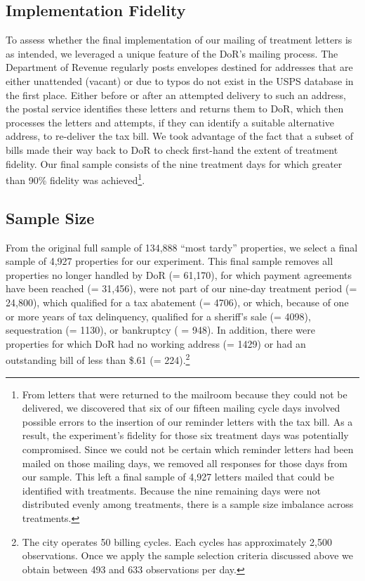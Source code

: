 \documentclass[12pt,titlepage]{article}
\begin{document}
\subsection{Implementation Fidelity}

To assess whether the final implementation of our mailing of treatment
letters is as intended, we leveraged a unique feature of the DoR's
mailing process.  The Department of Revenue regularly posts envelopes
destined for addresses that are either unattended (vacant) or due to typos do not
exist in the USPS database in the first place. Either before or after an
attempted delivery to such an address, the postal service identifies
these letters and returns them to DoR, which then processes the
letters and attempts, if they can identify a suitable alternative
address, to re-deliver the tax bill. We took advantage of the fact
that a subset of bills made their way back to DoR to check first-hand
the extent of treatment fidelity. Our final sample consists of the
nine treatment days for which greater than 90\% fidelity was
achieved\footnote{From letters that were returned to the 
mailroom because they could not be delivered, we discovered that six 
of our fifteen mailing cycle days involved possible errors to the 
insertion of our reminder letters with the tax bill.  As a result, 
the experiment's fidelity for those six treatment days was 
potentially compromised.  Since we could not be certain which 
reminder letters had been mailed on those mailing days, we removed 
all responses for those days from our sample.  This left a final 
sample of 4,927 letters mailed that could be identified with 
treatments.  Because the nine remaining days were not distributed 
evenly among treatments, there is a sample size imbalance across treatments.}.

\subsection{Sample Size}

From the original full sample of 134,888 ``most tardy'' properties, we
select a final sample of 4,927 properties for our experiment.  This
final sample removes all properties no longer handled by DoR (=
61,170), for which payment agreements have been reached (= 31,456),
were not part of our nine-day treatment period (= 24,800), which
qualified for a tax abatement (= 4706), or which, because of one or more
years of tax delinquency, qualified for a sheriff's sale (= 4098),
sequestration (= 1130), or bankruptcy ( = 948).  In addition,
there were properties for which DoR had no working address (= 1429) or
had an outstanding bill of less than \$.61 (= 224).\footnote{The city
  operates 50 billing cycles. Each cycles has approximately 2,500
  observations.  Once we apply the sample selection criteria discussed
  above we obtain between 493 and 633 observations per day.}
\end{document}
